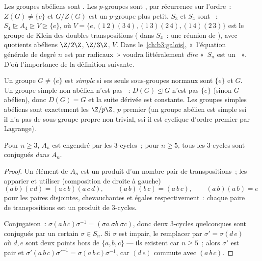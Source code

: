 \begin{example}\label{ex:b3:groups:solvableexamples}
Les groupes abéliens sont . Les $p$-groupes sont
, par récurrence sur l'ordre~: $Z(G) \neq \{e\}$ et
$G/Z(G)$ est un $p$-groupe plus petit. $S_3$ et $S_4$ sont
~: $S_4 \trianglerighteq A_4 \trianglerighteq V
\trianglerighteq \{e\}$, où $V = \{e, (1\,2)(3\,4), (1\,3)(2\,4),
(1\,4)(2\,3)\}$ est le groupe de Klein des doubles transpositions
( dans $S_4$~: une réunion de ), avec
quotients abéliens $\Z/2\Z$, $\Z/3\Z$, $V$. Dans
le~\cref{ch:b3:galois}, «~l'équation générale de degré $n$ est
 par radicaux~» voudra littéralement \emph{dire}
«~$S_n$ est un ~». D'où l'importance de la
définition suivante.
\end{example}

\begin{definition}\label{def:b3:groups:simple}
Un groupe $G \neq \{e\}$ est \emph{simple} si
ses seuls sous-groupes normaux sont $\{e\}$ et $G$. Un groupe
simple non abélien n'est pas ~: $D(G) \trianglelefteq G$
n'est pas $\{e\}$ (sinon $G$ abélien), donc $D(G) = G$ et la suite
dérivée est constante. Les groupes simples abéliens sont
exactement les $\Z/p\Z$, $p$ premier (un groupe abélien est simple
ssi il n'a pas de sous-groupe propre non trivial, ssi il est
cyclique d'ordre premier par Lagrange).
\end{definition}

\begin{lemma}\label{lem:b3:groups:threecycles}
Pour $n \geq 3$, $A_n$ est engendré par les $3$-cycles~; pour $n
\geq 5$, tous les $3$-cycles sont conjugués \emph{dans $A_n$}.
\end{lemma}

\begin{proof}
Un élément de $A_n$ est un produit d'un nombre pair de
transpositions~; les apparier et utiliser (composition de droite
à gauche)
\[
(a\,b)(c\,d) = (a\,c\,b)(a\,c\,d), \qquad
(a\,b)(b\,c) = (a\,b\,c), \qquad
(a\,b)(a\,b) = e
\]
pour les paires disjointes, chevauchantes et égales
respectivement~: chaque paire de transpositions est un produit de
$3$-cycles.

Conjugaison~: $\sigma(a\,b\,c)\sigma^{-1} = (\sigma a\; \sigma b\;
\sigma c)$, donc deux $3$-cycles quelconques sont conjugués par un
certain $\sigma \in S_n$. Si $\sigma$ est impair, le remplacer par
$\sigma' = \sigma (d\,e)$ où $d, e$ sont deux points hors de
$\{a, b, c\}$ --- ils existent car $n \geq 5$~; alors $\sigma'$
est pair et $\sigma'(a\,b\,c)\sigma'^{-1} =
\sigma(a\,b\,c)\sigma^{-1}$, car $(d\,e)$ commute avec $(a\,b\,c)$.
\end{proof}

